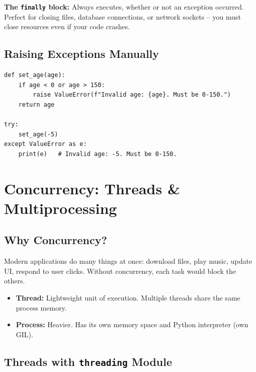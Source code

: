\documentclass[12pt,a4paper]{article}
\begin{document}
\begin{notebox}
\textbf{The \texttt{finally} block:} Always executes, whether or not an exception occurred. Perfect for closing files, database connections, or network sockets -- you must close resources even if your code crashes.
\end{notebox}

\subsection{Raising Exceptions Manually}

\begin{lstlisting}
def set_age(age):
    if age < 0 or age > 150:
        raise ValueError(f"Invalid age: {age}. Must be 0-150.")
    return age

try:
    set_age(-5)
except ValueError as e:
    print(e)   # Invalid age: -5. Must be 0-150.
\end{lstlisting}

\section{Concurrency: Threads \& Multiprocessing}

\subsection{Why Concurrency?}

Modern applications do many things at once: download files, play music, update UI, respond to user clicks. Without concurrency, each task would block the others.

\begin{itemize}
  \item \textbf{Thread:} Lightweight unit of execution. Multiple threads share the same process memory.
  \item \textbf{Process:} Heavier. Has its own memory space and Python interpreter (own GIL).
\end{itemize}

\subsection{Threads with \texttt{threading} Module}
\end{document}
